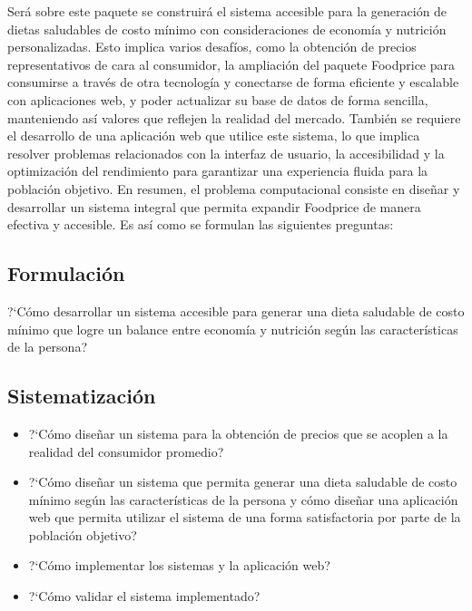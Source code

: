 Ser\'a sobre este paquete se construir\'a el sistema accesible para la generaci\'on de dietas saludables de costo m\'inimo con consideraciones de econom\'ia y nutrici\'on personalizadas. Esto implica varios desaf\'ios, como la obtenci\'on de precios representativos de cara al consumidor, la ampliaci\'on del paquete Foodprice para consumirse a trav\'es de otra tecnolog\'ia y conectarse de forma eficiente y escalable con aplicaciones web, y poder actualizar su base de datos de forma sencilla, manteniendo as\'i valores que reflejen la realidad del mercado. Tambi\'en se requiere el desarrollo de una aplicaci\'on web que utilice este sistema, lo que implica resolver problemas relacionados con la interfaz de usuario, la accesibilidad y la optimizaci\'on del rendimiento para garantizar una experiencia fluida para la poblaci\'on objetivo. En resumen, el problema computacional consiste en dise\~{n}ar y desarrollar un sistema integral que permita expandir Foodprice de manera efectiva y accesible. Es as\'i como se formulan las siguientes preguntas:





\subsection{Formulaci\'on}
\noindent?`C\'omo desarrollar un sistema accesible para generar una dieta saludable de costo m\'inimo que logre un balance entre econom\'ia y nutrici\'on seg\'un las caracter\'isticas de la persona?

\subsection{Sistematizaci\'on}
\begin{itemize}
    \item?`C\'omo dise\~{n}ar un sistema para la obtenci\'on de precios que se acoplen a la realidad del consumidor promedio?

    
    \item?`C\'omo dise\~{n}ar un sistema que permita generar una dieta saludable de costo m\'inimo seg\'un las caracter\'isticas de la persona y c\'omo dise\~{n}ar una aplicaci\'on  web que permita utilizar el sistema de una forma satisfactoria por parte de la poblaci\'on objetivo?
    
    \item?`C\'omo implementar los sistemas y la aplicaci\'on web?
        
    \item?`C\'omo validar el sistema implementado?
\end{itemize}

